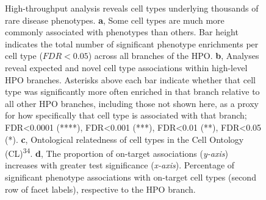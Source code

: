 \documentclass[
]{article}
\begin{document}
\label{cell-fig-summary}
\begin{figure}[H]


\caption{\label{fig-summary}High-throughput analysis reveals cell types
underlying thousands of rare disease phenotypes. \textbf{a}, Some cell
types are much more commonly associated with phenotypes than others. Bar
height indicates the total number of significant phenotype enrichments
per cell type (\(FDR<0.05\)) across all branches of the HPO. \textbf{b},
Analyses reveal expected and novel cell type associations within
high-level HPO branches. Asterisks above each bar indicate whether that
cell type was significantly more often enriched in that branch relative
to all other HPO branches, including those not shown here, as a proxy
for how specifically that cell type is associated with that branch;
FDR\textless0.0001 (****), FDR\textless0.001 (***), FDR\textless0.01
(**), FDR\textless0.05 (*). \textbf{c}, Ontological relatedness of cell
types in the Cell Ontology (CL)\textsuperscript{34}. \textbf{d}, The
proportion of on-target associations (\emph{y-axis}) increases with
greater test significance (\emph{x-axis}). Percentage of significant
phenotype associations with on-target cell types (second row of facet
labels), respective to the HPO branch.}

\end{figure}%
\end{document}
